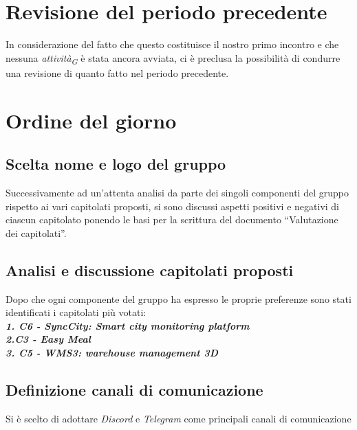 \documentclass{article}
\begin{document}
\maketitle
\thispagestyle{fancy}
\tableofcontents
{}
\pagebreak

\flushleft

\section{Revisione del periodo precedente}
    In considerazione del fatto che questo costituisce il nostro primo incontro e che nessuna \textit{attività}\textsubscript{\textit{G}} è stata ancora avviata, ci è preclusa la possibilità di condurre una revisione di quanto fatto nel periodo precedente. 

\section{Ordine del giorno}

    \subsection{Scelta nome e logo del gruppo}
        Successivamente ad un’attenta analisi da parte dei singoli componenti del gruppo rispetto
        ai vari capitolati proposti, si sono discussi aspetti positivi e negativi di ciascun capitolato ponendo le basi per la scrittura del documento “Valutazione dei capitolati”. \subsection{Analisi e discussione capitolati proposti} 
        Dopo che ogni componente del gruppo ha espresso le proprie preferenze sono stati identificati i capitolati più votati:\\ 
        \textbf{\textit{1. C6 - SyncCity: Smart city monitoring platform\\2.C3 - Easy Meal\\3. C5 - WMS3: warehouse management 3D}} 

    \subsection{Definizione canali di comunicazione}
        Si è scelto di adottare \textit{Discord} e \textit{Telegram} come principali canali di comunicazione 
\end{document}

